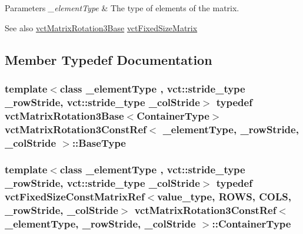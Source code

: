 \begin{DoxyParams}{Parameters}
{\em \+\_\+element\+Type} & The type of elements of the matrix.\\
\hline
\end{DoxyParams}
\begin{DoxySeeAlso}{See also}
\hyperlink{classvct_matrix_rotation3_base}{vct\+Matrix\+Rotation3\+Base} \hyperlink{classvct_fixed_size_matrix}{vct\+Fixed\+Size\+Matrix} 
\end{DoxySeeAlso}


\subsection{Member Typedef Documentation}
\hypertarget{classvct_matrix_rotation3_const_ref_a72312c3cf0fe6a145043764cdd412bad}{}
\subsubsection[{Base\+Type}]{\setlength{\rightskip}{0pt plus 5cm}template$<$class \+\_\+element\+Type , vct\+::stride\+\_\+type \+\_\+row\+Stride, vct\+::stride\+\_\+type \+\_\+col\+Stride$>$ typedef {\bf vct\+Matrix\+Rotation3\+Base}$<${\bf Container\+Type}$>$ {\bf vct\+Matrix\+Rotation3\+Const\+Ref}$<$ \+\_\+element\+Type, \+\_\+row\+Stride, \+\_\+col\+Stride $>$\+::{\bf Base\+Type}}\label{classvct_matrix_rotation3_const_ref_a72312c3cf0fe6a145043764cdd412bad}
\hypertarget{classvct_matrix_rotation3_const_ref_ae183b3a17186cc240b1cba80e74d0724}{}
\subsubsection[{Container\+Type}]{\setlength{\rightskip}{0pt plus 5cm}template$<$class \+\_\+element\+Type , vct\+::stride\+\_\+type \+\_\+row\+Stride, vct\+::stride\+\_\+type \+\_\+col\+Stride$>$ typedef {\bf vct\+Fixed\+Size\+Const\+Matrix\+Ref}$<$value\+\_\+type, {\bf R\+O\+W\+S}, {\bf C\+O\+L\+S}, \+\_\+row\+Stride, \+\_\+col\+Stride$>$ {\bf vct\+Matrix\+Rotation3\+Const\+Ref}$<$ \+\_\+element\+Type, \+\_\+row\+Stride, \+\_\+col\+Stride $>$\+::{\bf Container\+Type}}\label{classvct_matrix_rotation3_const_ref_ae183b3a17186cc240b1cba80e74d0724}
\hypertarget{classvct_matrix_rotation3_const_ref_a92075d31084a3f4bb466e724a8719693}{}

